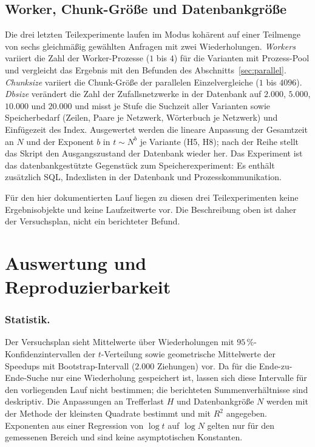 \documentclass[a4paper,12pt, twoside]{report}
\theoremstyle{definition}
\begin{document}
\subsection{Worker, Chunk-Größe und Datenbankgröße}
\label{sec:ucx_skalierung}

Die drei letzten Teilexperimente laufen im Modus kohärent auf einer Teilmenge von sechs gleichmäßig gewählten Anfragen mit zwei Wiederholungen. \emph{Workers} variiert die Zahl der Worker-Prozesse ($1$ bis $4$) für die Varianten mit Prozess-Pool und vergleicht das Ergebnis mit den Befunden des Abschnitts~\ref{sec:parallel}. \emph{Chunksize} variiert die Chunk-Größe der parallelen Einzelvergleiche ($1$ bis $4096$). \emph{Dbsize} verändert die Zahl der Zufallsnetzwerke in der Datenbank auf $2.000$, $5.000$, $10.000$ und $20.000$ und misst je Stufe die Suchzeit aller Varianten sowie Speicherbedarf (Zeilen, Paare je Netzwerk, Wörterbuch je Netzwerk) und Einfügezeit des Index. Ausgewertet werden die lineare Anpassung der Gesamtzeit an $N$ und der Exponent $b$ in $t\sim N^b$ je Variante (H5, H8); nach der Reihe stellt das Skript den Ausgangszustand der Datenbank wieder her. Das Experiment ist das datenbankgestützte Gegenstück zum Speicherexperiment: Es enthält zusätzlich SQL, Indexlisten in der Datenbank und Prozesskommunikation.

Für den hier dokumentierten Lauf liegen zu diesen drei Teilexperimenten keine Ergebnisobjekte und keine Laufzeitwerte vor. Die Beschreibung oben ist daher der Versuchsplan, nicht ein berichteter Befund.

\section{Auswertung und Reproduzierbarkeit}
\label{sec:ucx_auswertung}

\subsubsection{Statistik.} Der Versuchsplan sieht Mittelwerte über Wiederholungen mit $95\,\%$-Konfidenzintervallen der $t$-Verteilung sowie geometrische Mittelwerte der Speedups mit Bootstrap-Intervall ($2.000$ Ziehungen) vor. Da für die Ende-zu-Ende-Suche nur eine Wiederholung gespeichert ist, lassen sich diese Intervalle für den vorliegenden Lauf nicht bestimmen; die berichteten Summenverhältnisse sind deskriptiv. Die Anpassungen an Trefferlast $H$ und Datenbankgröße $N$ werden mit der Methode der kleinsten Quadrate bestimmt und mit $R^2$ angegeben. Exponenten aus einer Regression von $\log t$ auf $\log N$ gelten nur für den gemessenen Bereich und sind keine asymptotischen Konstanten.
\end{document}
